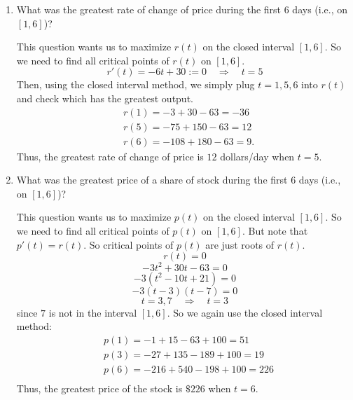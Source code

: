 \documentclass[handout,nooutcomes]{ximera}
\begin{document}
\begin{problem}
\begin{enumerate}
		
		
	
	\item  What was the greatest rate of change of price during the first $6$ days (i.e., on $[1,6]$)?  
		\begin{freeResponse}
		This question wants us to maximize $r(t)$ on the closed interval $[1,6]$.  
		So we need to find all critical points of $r(t)$ on $[1,6]$.  
		$$ r'(t) = -6t+30:=0 \quad \Longrightarrow \quad t=5  $$
		Then, using the closed interval method, we simply plug $t=1,5,6$ into $r(t)$ and check which has the greatest output.  
			\begin{align*}
			&r(1) = -3+30-63=-36  \\
			&r(5) = -75+150-63=12  \\
			&r(6) = -108+180-63=9.
			\end{align*}
		Thus, the greatest rate of change of price is $12$ dollars/day when $t=5$.  
		\end{freeResponse}
		
		
		
	
	\item  What was the greatest price of a share of stock during the first $6$ days (i.e., on $[1,6]$)?  
		\begin{freeResponse}
		This question wants us to maximize $p(t)$ on the closed interval $[1,6]$.  
		So we need to find all critical points of $p(t)$ on $[1,6]$. 
		But note that $p'(t) = r(t)$.  So critical points of $p(t)$ are just roots of $r(t)$.  
		$$ r(t) = 0 $$
		$$ -3t^2+30t-63 = 0 $$
		$$ -3(t^2-10t+21)=0 $$
		$$ -3(t-3)(t-7) = 0 $$
		$$ t=3,7 \quad \Longrightarrow \quad t=3 $$
		since $7$ is not in the interval $[1,6]$.  
		So we again use the closed interval method:
			\begin{align*}
			&p(1) = -1+15-63+100 = 51  \\
			&p(3) = -27 + 135 - 189 + 100 = 19  \\
			&p(6) = -216+540-198+100=226  \\
			\end{align*}
		Thus, the greatest price of the stock is $\$226$ when $t=6$.  
		\end{freeResponse}
		
		
		
	
	\end{enumerate}


\end{problem}



	
	
	
	
\end{document}
